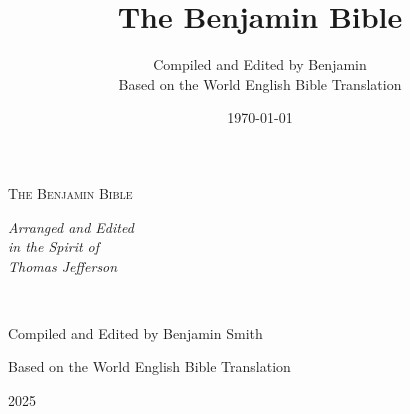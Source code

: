 

\title{The Benjamin Bible}
\author{Compiled and Edited by Benjamin \\[0.3em]
{\small Based on the World English Bible Translation}}
\date{\today}


\sloppy
\raggedright

\begin{titlepage}
    \centering
    \vspace*{2cm}

    {\Huge\scshape The Benjamin Bible\par}
    \vspace{1cm}

    {\Large\itshape 
    Arranged and Edited\\ in the Spirit of\\ Thomas Jefferson\par}
    \vspace{1cm}

    \\[0.5cm]

    {\large Compiled and Edited by Benjamin Smith\par}
    \vspace{0.3cm}
    {\small Based on the World English Bible Translation\par}

    \vspace{0.5cm}

    \vfill
    {\large 2025 \par}
\end{titlepage}




